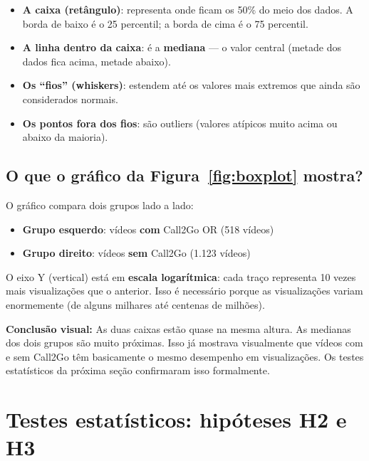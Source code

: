 \documentclass[12pt,a4paper]{article}
\begin{document}
\begin{itemize}
  \item \textbf{A caixa (retângulo)}: representa onde ficam os 50\% do meio
        dos dados. A borda de baixo é o 25\textordmasculine{} percentil; a
        borda de cima é o 75\textordmasculine{} percentil.
  \item \textbf{A linha dentro da caixa}: é a \textbf{mediana} --- o valor
        central (metade dos dados fica acima, metade abaixo).
  \item \textbf{Os ``fios'' (whiskers)}: estendem até os valores mais extremos
        que ainda são considerados normais.
  \item \textbf{Os pontos fora dos fios}: são outliers (valores atípicos muito
        acima ou abaixo da maioria).
\end{itemize}

\subsection{O que o gráfico da Figura~\ref{fig:boxplot} mostra?}

O gráfico compara dois grupos lado a lado:

\begin{itemize}
  \item \textbf{Grupo esquerdo}: vídeos \textbf{com} Call2Go OR (518 vídeos)
  \item \textbf{Grupo direito}: vídeos \textbf{sem} Call2Go (1.123 vídeos)
\end{itemize}

O eixo Y (vertical) está em \textbf{escala logarítmica}: cada traço
representa 10 vezes mais visualizações que o anterior. Isso é necessário
porque as visualizações variam enormemente (de alguns milhares até centenas
de milhões).

\textbf{Conclusão visual:} As duas caixas estão quase na mesma altura. As
medianas dos dois grupos são muito próximas. Isso já mostrava visualmente
que vídeos com e sem Call2Go têm basicamente o mesmo desempenho em
visualizações. Os testes estatísticos da próxima seção confirmaram isso
formalmente.

\section{Testes estatísticos: hipóteses H2 e H3}
\end{document}
